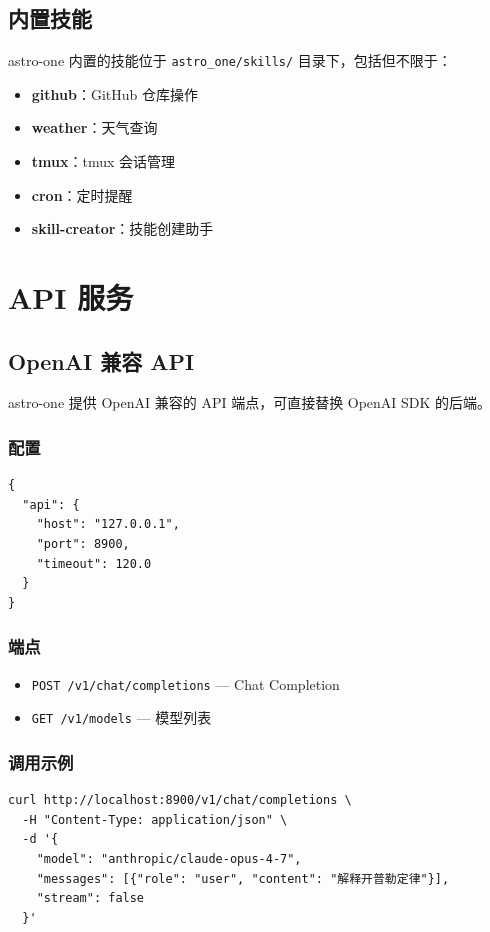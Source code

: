\documentclass[12pt,a4paper,UTF8]{ctexart}
\begin{document}
\section{内置技能}

astro-one 内置的技能位于 \texttt{astro\_one/skills/} 目录下，包括但不限于：

\begin{itemize}
    \item \textbf{github}：GitHub 仓库操作
    \item \textbf{weather}：天气查询
    \item \textbf{tmux}：tmux 会话管理
    \item \textbf{cron}：定时提醒
    \item \textbf{skill-creator}：技能创建助手
\end{itemize}

\chapter{API 服务}

\section{OpenAI 兼容 API}

astro-one 提供 OpenAI 兼容的 API 端点，可直接替换 OpenAI SDK 的后端。

\subsection{配置}
\begin{verbatim}
{
  "api": {
    "host": "127.0.0.1",
    "port": 8900,
    "timeout": 120.0
  }
}
\end{verbatim}

\subsection{端点}
\begin{itemize}
    \item \texttt{POST /v1/chat/completions} — Chat Completion
    \item \texttt{GET /v1/models} — 模型列表
\end{itemize}

\subsection{调用示例}
\begin{verbatim}
curl http://localhost:8900/v1/chat/completions \
  -H "Content-Type: application/json" \
  -d '{
    "model": "anthropic/claude-opus-4-7",
    "messages": [{"role": "user", "content": "解释开普勒定律"}],
    "stream": false
  }'
\end{verbatim}
\end{document}
